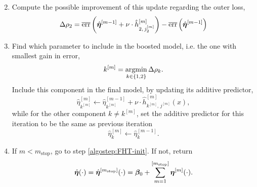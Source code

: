 \begin{enumerate}
\begin{equation*}
        \end{equation*}
    \item
        Compute the possible improvement of this update regarding the outer loss,
        \begin{equation*}
            \Delta\rho_2=\overline{\text{err}}\left(\hat{\boldsymbol{\eta}}^{[m-1]} + \nu \cdot \hat{h}^{[m]}_{2,\,j_2^{[m]}} \right)-\overline{\text{err}}\left(\hat{\boldsymbol{\eta}}^{[m-1]}  \right)
        \end{equation*}
    \item
    \label{algostep:FHT-end}
        Find which parameter to include in the boosted model, i.e. the one with smallest gain in error,
        \begin{equation*}
            k^{[m]}=\operatorname*{argmin}_{k\in\{1,2\}}\Delta\rho_k.
        \end{equation*}
        Include this component in the final model, by updating its additive predictor,
        \begin{equation*}
            \hat{\eta}^{[m]}_{k^{[m]}}\gets\hat{\eta}^{[m-1]}_{k^{[m]}}+\nu\cdot\hat{h}^{[m]}_{k^{[m]},\,j^{[m]}}(x),
        \end{equation*}
        while for the other component $k\neq k^{[m]}$, set the additive predictor for this iteration to be the same as previous iteration
        \begin{equation*}
            \hat{\eta}^{[m]}_{k}\gets\hat{\eta}^{[m-1]}_{k}.
        \end{equation*}
    \item
        If $m<m_{\text{stop}}$, go to step \ref{algostep:FHT-init}.
        If not, return
        \begin{equation*}
            \hat{\boldsymbol{\eta}}(\cdot)=\hat{\boldsymbol{\eta}}^{[m_{\text{stop}}]}(\cdot)=\boldsymbol{\beta}_0+\sum_{m=1}^{[m_{\text{stop}}]}\boldsymbol{\eta}^{[m]}(\cdot).
        \end{equation*}
\end{enumerate}

